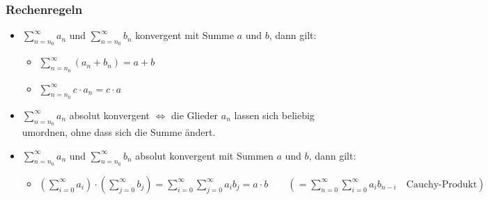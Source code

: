 \subsubsection{Rechenregeln}
\begin{itemize}
\item $\sum_{n=n_0}^\infty a_n$ und $\sum_{n=n_0}^\infty b_n$ konvergent mit Summe $a$ und $b$, dann gilt: 
\begin{itemize}
\item $\sum_{n=n_0}^\infty (a_n+b_n)= a + b$
\item $\sum_{n=n_0}^\infty c\cdot a_n= c\cdot a$
\end{itemize}
\item $\sum_{n=n_0}^\infty a_n$ absolut konvergent $\Leftrightarrow$ die Glieder $a_n$ lassen sich beliebig umordnen, ohne dass sich die Summe ändert.
\item $\sum_{n=n_0}^\infty a_n$ und $\sum_{n=n_0}^\infty b_n$ absolut konvergent mit Summen $a$ und $b$, dann gilt:
\begin{itemize}
\item $\left(\sum_{i=0}^\infty a_i\right)\cdot \left( \sum_{j=0}^\infty b_j\right)=\sum_{i=0}^\infty  \sum_{j=0}^\infty a_i b_j=a\cdot b \qquad \left( =\sum_{n=0}^\infty  \sum_{i=0}^\infty a_i b_{n-i} \quad \text{Cauchy-Produkt}\right)$
\end{itemize}
\end{itemize}